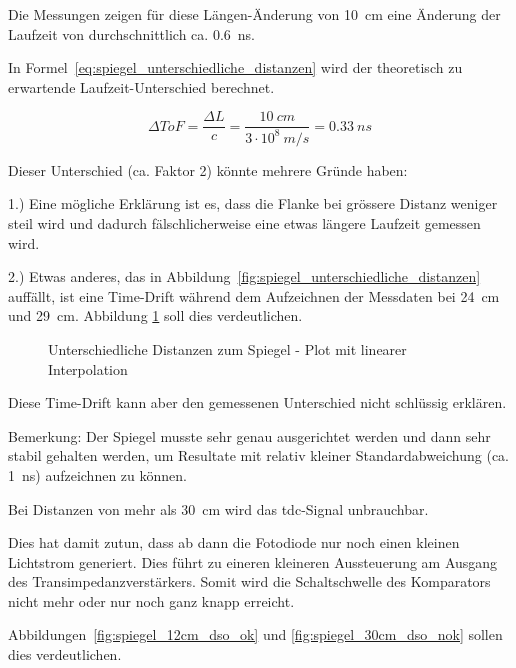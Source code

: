 Die Messungen zeigen für diese Längen-Änderung von 10~cm eine Änderung der Laufzeit von durchschnittlich ca. 0.6~ns.

In Formel~\ref{eq:spiegel_unterschiedliche_distanzen} wird der theoretisch zu erwartende Laufzeit-Unterschied berechnet.

\begin{equation}\label{eq:spiegel_unterschiedliche_distanzen}
    \Delta ToF = \frac{\Delta L}{c} = \frac{10~cm}{3 \cdot 10^8~m/s} = 0.33~ns
\end{equation}


Dieser Unterschied (ca. Faktor 2) könnte mehrere Gründe haben:

1.) Eine mögliche Erklärung ist es, dass die Flanke bei
grössere Distanz weniger steil wird und dadurch fälschlicherweise eine etwas längere Laufzeit gemessen wird.

2.) Etwas anderes, das in Abbildung~\ref{fig:spiegel_unterschiedliche_distanzen} auffällt, ist eine Time-Drift während
dem Aufzeichnen der Messdaten bei 24~cm und 29~cm. Abbildung \ref{fig:spiegel_unterschiedliche_distanzen_linear} soll
dies verdeutlichen.

\begin{figure}[H]
    \centering
    
    \caption{Unterschiedliche Distanzen zum Spiegel - Plot mit linearer Interpolation}\label{fig:spiegel_unterschiedliche_distanzen_linear}
\end{figure}

Diese Time-Drift kann aber den gemessenen Unterschied nicht schlüssig erklären.

Bemerkung: Der Spiegel musste sehr genau ausgerichtet werden und dann sehr stabil gehalten werden, um Resultate mit
relativ kleiner Standardabweichung (ca. 1~ns) aufzeichnen zu können.

Bei Distanzen von mehr als 30~cm wird das \acrshort{tdc}-Signal unbrauchbar.

Dies hat damit zutun, dass ab dann die Fotodiode nur noch einen kleinen Lichtstrom generiert. Dies führt zu eineren
kleineren Aussteuerung am Ausgang des Transimpedanzverstärkers. Somit wird die Schaltschwelle des Komparators nicht mehr
oder nur noch ganz knapp erreicht.

Abbildungen~\ref{fig:spiegel_12cm_dso_ok} und \ref{fig:spiegel_30cm_dso_nok} sollen dies verdeutlichen.

